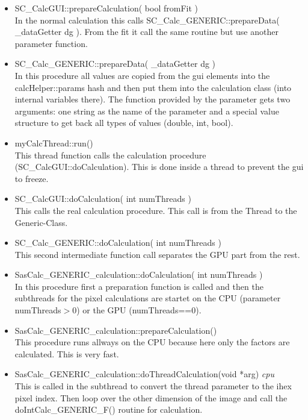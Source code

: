 \documentclass[11pt]{article} %
\begin{document}
\begin{itemize}
\item SC\_CalcGUI::prepareCalculation( bool fromFit ) \\
	In the normal calculation this calls SC\_Calc\_GENERIC::prepareData( \_dataGetter dg ). From the fit it call the same routine but use another parameter function.

\item SC\_Calc\_GENERIC::prepareData( \_dataGetter dg ) \\
	In this procedure all values are copied from the gui elements into the calcHelper::params hash and then put them into the calculation class (into internal variables there). The function provided by the parameter gets two arguments: one string as the name of the parameter and a special value structure to get back all types of values (double, int, bool).

\item myCalcThread::run() \\
	This thread function calls the calculation procedure (SC\_CalcGUI::doCalculation). This is done inside a thread to prevent the gui to freeze.

\item SC\_CalcGUI::doCalculation( int numThreads ) \\
	This calls the real calculation procedure. This call is from the Thread to the Generic-Class.

\item SC\_Calc\_GENERIC::doCalculation( int numThreads ) \\
	This second intermediate function call separates the GPU part from the rest.

\item SasCalc\_GENERIC\_calculation::doCalculation( int numThreads ) \\
	In this procedure first a preparation function is called and then the subthreads for the pixel calculations are startet on the CPU (parameter numThreads$>$0) or the GPU (numThreads==0).

\item SasCalc\_GENERIC\_calculation::prepareCalculation() \\
	This procedure runs allways on the CPU because here only the factors are calculated. This is very fast.

\item SasCalc\_GENERIC\_calculation::doThreadCalculation(void *arg) {\it cpu} \\
	This is called in the subthread to convert the thread parameter to the ihex pixel index. Then loop over the other dimension of the image and call the doIntCalc\_GENERIC\_F() routine for calculation.


\end{itemize}
\end{document}
